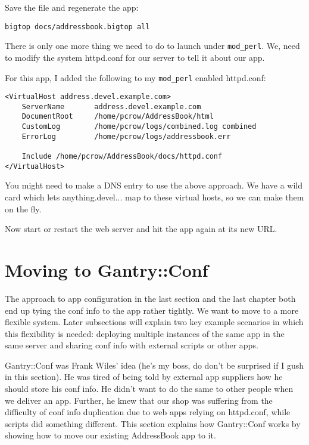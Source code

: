 Save the file and regenerate the app:

\begin{verbatim}
bigtop docs/addressbook.bigtop all
\end{verbatim}

There is only one more thing we need to do to launch under \verb+mod_perl+.
We, need to modify the system httpd.conf for our server to tell it about our
app.

For this app, I added the following to my \verb+mod_perl+ enabled httpd.conf:

\begin{verbatim}
<VirtualHost address.devel.example.com>
    ServerName       address.devel.example.com
    DocumentRoot     /home/pcrow/AddressBook/html
    CustomLog        /home/pcrow/logs/combined.log combined
    ErrorLog         /home/pcrow/logs/addressbook.err

    Include /home/pcrow/AddressBook/docs/httpd.conf
</VirtualHost>
\end{verbatim}

You might need to make a DNS entry to use the above approach.  We
have a wild card which lets anything.devel... map to these virtual hosts,
so we can make them on the fly.

Now start or restart the web server and hit the app again at its new URL.

\section{Moving to Gantry::Conf}

The approach to app configuration in the last section and the last chapter
both end up tying the conf info to the app rather tightly.  We want
to move to a more flexible system.  Later subsections will explain two
key example scenarios in which this flexibility is needed: deploying multiple
instances of the same app in the same server and sharing conf info with
external scripts or other apps.

Gantry::Conf was Frank Wiles' idea (he's my boss, do don't be surprised
if I gush in this section).  He was tired of being told by external
app suppliers how he should store his conf info.  He didn't want to do the
same to other people when we deliver an app.  Further, he knew that
our shop was suffering from the difficulty of conf info duplication due
to web apps relying on httpd.conf, while scripts did something different.
This section explains how Gantry::Conf works by showing how to move our
existing AddressBook app to it.

